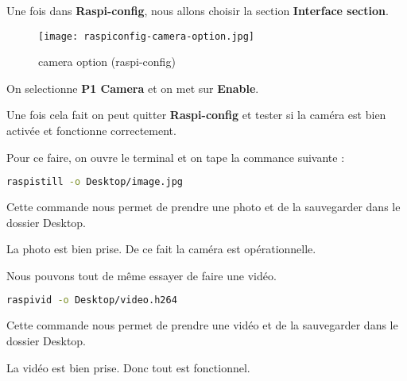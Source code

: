             \begin{flushleft}
                
                Une fois dans \textbf{Raspi-config}, nous allons choisir la section \textbf{Interface section}.
            
                \begin{figure}[h]
                    \centering
                    \texttt{[image: raspiconfig-camera-option.jpg]} 
                    \caption{camera option (raspi-config)}
                \end{figure}

                On selectionne \textbf{P1 Camera} et on met sur \textbf{Enable}.

                \vspace{0.2cm}

                Une fois cela fait on peut quitter \textbf{Raspi-config} et tester si la caméra est bien activée et fonctionne correctement.

                \vspace{0.2cm}

                Pour ce faire, on ouvre le terminal et on tape la commance suivante :

                \begin{flushleft}
                    \begin{lstlisting}[language=bash]
                        raspistill -o Desktop/image.jpg
                    \end{lstlisting}
                \end{flushleft}

                Cette commande nous permet de prendre une photo et de la sauvegarder dans le dossier Desktop.

                \vspace{0.2cm}

                La photo est bien prise. De ce fait la caméra est opérationnelle.

                Nous pouvons tout de même essayer de faire une vidéo.

                \begin{flushleft}
                    \begin{lstlisting}[language=bash]
                        raspivid -o Desktop/video.h264
                    \end{lstlisting}
                \end{flushleft}

                Cette commande nous permet de prendre une vidéo et de la sauvegarder dans le dossier Desktop.

                \vspace{0.2cm}

                La vidéo est bien prise. Donc tout est fonctionnel.
                
            \end{flushleft}

